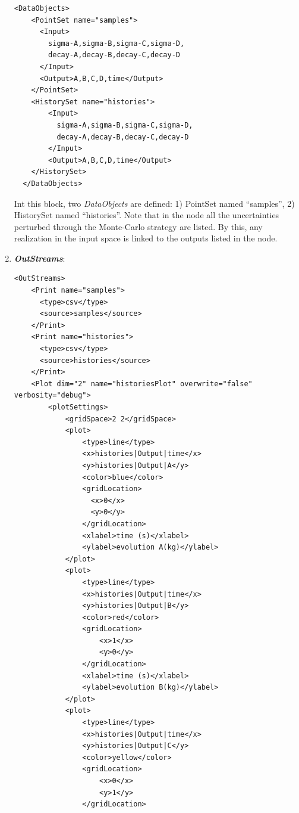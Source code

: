 \begin{enumerate}
\begin{lstlisting}[style=XML,morekeywords={arg,extension,pauseAtEnd,overwrite}]
  <DataObjects>
    <PointSet name="samples">
      <Input>
        sigma-A,sigma-B,sigma-C,sigma-D,
        decay-A,decay-B,decay-C,decay-D
      </Input>
      <Output>A,B,C,D,time</Output>
    </PointSet>
    <HistorySet name="histories">
        <Input>
          sigma-A,sigma-B,sigma-C,sigma-D,
          decay-A,decay-B,decay-C,decay-D
        </Input>
        <Output>A,B,C,D,time</Output>
    </HistorySet>
  </DataObjects>
\end{lstlisting}
  Int this block, two \textit{DataObjects} are defined: 1) PointSet named 
  ``samples'', 2) HistorySet named ``histories''.
  Note that in the  node all the uncertainties 
  perturbed through the Monte-Carlo strategy are listed. By this, any
  realization in the input space is linked to the outputs listed in the 
   node.
   \item \textbf{\textit{OutStreams}}:   
\begin{lstlisting}[style=XML,morekeywords={arg,extension,pauseAtEnd,overwrite}]
  <OutStreams>
    <Print name="samples">
      <type>csv</type>
      <source>samples</source>
    </Print>
    <Print name="histories">
      <type>csv</type>
      <source>histories</source>
    </Print>
    <Plot dim="2" name="historiesPlot" overwrite="false" verbosity="debug">
        <plotSettings>
            <gridSpace>2 2</gridSpace>
            <plot>
                <type>line</type>
                <x>histories|Output|time</x>
                <y>histories|Output|A</y>
                <color>blue</color>
                <gridLocation>
                  <x>0</x>
                  <y>0</y>
                </gridLocation>
                <xlabel>time (s)</xlabel>
                <ylabel>evolution A(kg)</ylabel>
            </plot>
            <plot>
                <type>line</type>
                <x>histories|Output|time</x>
                <y>histories|Output|B</y>
                <color>red</color>
                <gridLocation>
                    <x>1</x>
                    <y>0</y>
                </gridLocation>
                <xlabel>time (s)</xlabel>
                <ylabel>evolution B(kg)</ylabel>
            </plot>
            <plot>
                <type>line</type>
                <x>histories|Output|time</x>
                <y>histories|Output|C</y>
                <color>yellow</color>
                <gridLocation>
                    <x>0</x>
                    <y>1</y>
                </gridLocation>

\end{lstlisting}
\end{enumerate}
